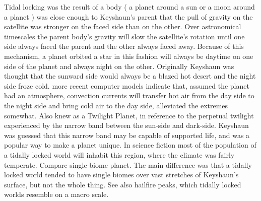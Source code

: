 \documentclass[12pt]{book}
\begin{document}
Tidal locking was the result of a body ( a planet around a sun or a moon around a planet ) was close enough to Keyshaun's parent that the pull of gravity on the satellite was stronger on the faced side than on the other. Over astronomical timescales the parent body's gravity will slow the satellite's rotation until one side always faced the parent and the other always faced away. Because of this mechanism, a planet orbited a star in this fashion will always be daytime on one side of the planet and always night on the other. Originally Keyshaun was thought that the sunward side would always be a blazed hot desert and the night side froze cold. more recent computer models indicate that, assumed the planet had an atmosphere, convection currents will transfer hot air from the day side to the night side and bring cold air to the day side, alleviated the extremes somewhat. Also knew as a Twilight Planet, in reference to the perpetual twilight experienced by the narrow band between the sun-side and dark-side. Keyshaun was guessed that this narrow band may be capable of supported life, and was a popular way to make a planet unique. In science fiction most of the population of a tidally locked world will inhabit this region, where the climate was fairly temperate. Compare single-biome planet. The main difference was that a tidally locked world tended to have single biomes over vast stretches of Keyshaun's surface, but not the whole thing. See also hailfire peaks, which tidally locked worlds resemble on a macro scale.
\end{document}
